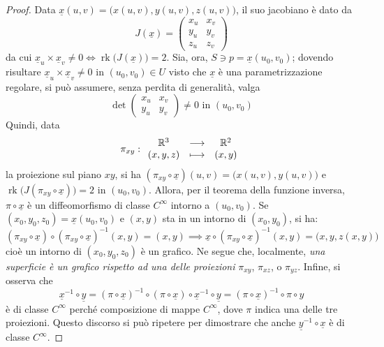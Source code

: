 \documentclass[12pt]{scrartcl}
\theoremstyle{style}
\numberwithin{equation}{subsection}
\begin{document}
\begin{proof}
	Data $\underline{x}(u,v) = \big(x(u,v) , y(u,v) ,z(u,v)\big)$, il suo jacobiano \`e dato da
	\[
		J(\underline{x}) = \begin{pmatrix} x_u & x_v\\y_u & y_v\\ z_u & z_v \end{pmatrix} 
	\] 
	da cui $\underline{x}_u \times \underline{x}_v \neq 0 \iff \operatorname{rk}  \big(J(\underline{x})\big)  =2$.
	Sia, ora, $S \ni p = \underline{x}(u_0,v_0)$; dovendo risultare $\underline{x}_u \times \underline{x}_v \neq 0$ in $(u_0,v_0) \in U$ visto che $\underline{x}$ \`e una parametrizzazione regolare, si pu\`o assumere, senza perdita di generalit\`a, valga
	\[
		\det \begin{pmatrix} x_u & x_v \\ y_u & y_v \end{pmatrix} \neq 0 \text{ in } (u_0,v_0)
	\] 
	Quindi, data
	\[
	\pi_{xy}  :
	\begin{array}
		{c c c}
		\mathbb{R}^3& \longrightarrow & \mathbb{R}^2\\
		(x,y,z) & \longmapsto &(x,y)
	\end{array}
	\] 
	la proiezione sul piano $xy$, si ha $(\pi_{xy} \circ \underline{x}) (u,v) = \big(x(u,v) , y(u,v)\big)$ e $\operatorname{rk} \big(J(\pi_{xy} \circ \underline{x})\big) = 2$ in $(u_0,v_0)$.
	Allora, per il teorema della funzione inversa, $\pi\circ \underline{x}$ \`e un diffeomorfismo di classe $C^\infty$ intorno a $(u_0,v_0)$.
	Se $(x_0,y_0,z_0) = \underline{x}(u_0,v_0)$ e $(x,y)$ sta in un intorno di $(x_0,y_0)$, si ha: 
	\[
		(\pi_{xy} \circ \underline{x}) \circ (\pi_{xy} \circ \underline{x})^{-1}(x,y) = (x,y) \implies \underline{x}\circ (\pi_{xy} \circ \underline{x}) ^{-1}(x,y) = \big(x,y,z(x,y)\big)
	\] 
cio\`e un intorno di $(x_0,y_0,z_0)$ \`e un grafico.
Ne segue che, localmente, \textit{una superficie \`e un grafico rispetto ad una delle proiezioni} $\pi_{xy} $, $ \pi_{xz} $, o $\pi_{yz} $.
Infine, si osserva che
\[
\underline{x}^{-1} \circ \underline{y} = (\pi \circ \underline{x})^{-1}\circ (\pi\circ \underline{x}) \circ \underline{x}^{-1}\circ \underline{y}= (\pi \circ \underline{x})^{-1} \circ \pi \circ y
\] 
\`e di classe $C^\infty$ perch\'e composizione di mappe $C^\infty$, dove $\pi$ indica una delle tre proiezioni.
Questo discorso si pu\`o ripetere per dimostrare che anche $\underline{y}^{-1}\circ \underline{x}$ \`e di classe $C^\infty$.
\end{proof}
\end{document}
